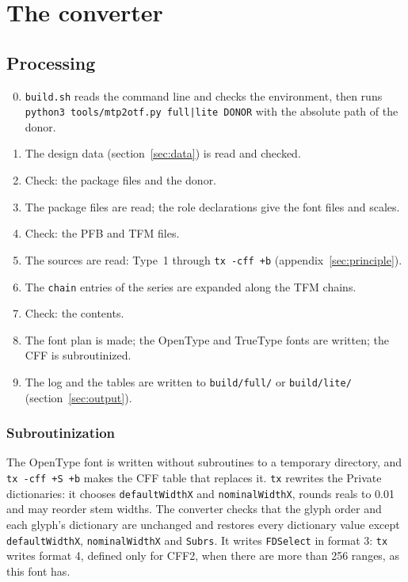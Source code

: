\documentclass[10pt]{article}
\newcommand\file[1]{\texttt{#1}}
\newcommand\code[1]{\texttt{#1}}
\begin{document}

\section{The converter}\label{app:converter}

\subsection{Processing}

\begin{enumerate}
\setcounter{enumi}{-1}
\item \file{build.sh} reads the command line and checks the
  environment, then runs\\ \code{python3 tools/mtp2otf.py full|lite
  DONOR} with the absolute path of the donor.
\item The design data (section~\ref{sec:data}) is read and checked.
\item Check: the package files and the donor.
\item The package files are read; the role declarations give the font
  files and scales.
\item Check: the PFB and TFM files.
\item The sources are read: Type~1 through \code{tx -cff +b}
  (appendix~\ref{sec:principle}).
\item The \code{chain} entries of the series are expanded along the TFM
  chains.
\item Check: the contents.
\item The font plan is made; the OpenType and TrueType fonts are
  written; the CFF is subroutinized.
\item The log and the tables are written to \file{build/full/} or
  \file{build/lite/} (section~\ref{sec:output}).
\end{enumerate}

\subsubsection{Subroutinization}

The OpenType font is written without subroutines to a temporary
directory, and \code{tx -cff +S +b} makes the CFF table that replaces
it.  \code{tx} rewrites the Private dictionaries: it chooses
\code{defaultWidthX} and \code{nominalWidthX}, rounds reals to 0.01 and
may reorder stem widths.  The converter checks that the glyph order and
each glyph's dictionary are unchanged and restores every dictionary
value except \code{defaultWidthX}, \code{nominalWidthX} and
\code{Subrs}.  It writes \code{FDSelect} in format 3: \code{tx} writes
format 4, defined only for CFF2, when there are more than 256 ranges,
as this font has.
\end{document}

